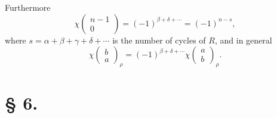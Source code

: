 \documentclass[11pt]{article}
\begin{document}
Furthermore
\begin{equation}\tag{4.}
 \chi\left(\begin{matrix}n-1\\0\end{matrix}\right)=(-1)^{\beta+
\delta+\cdots}=(-1)^{n-s},
\end{equation}
where $s=\alpha+
\beta+
\gamma+
\delta+
\cdots$ is the number of cycles of $R$, and in general
\[
 \chi\left(\begin{matrix}b\\a\end{matrix}\right)_\rho=(-1)^{\beta+
\delta+
\cdots}\chi\left(\begin{matrix}a\\b\end{matrix}\right)_\rho.
\]

\section*{§ 6.}
\end{document}
